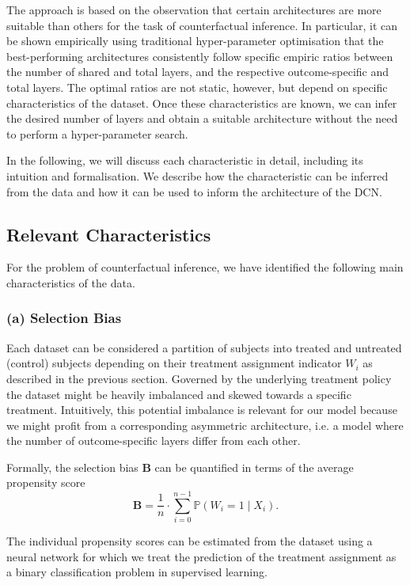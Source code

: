 The approach is based on the observation that certain architectures are more suitable than others for the task of counterfactual inference. In particular, it can be shown empirically using traditional hyper-parameter optimisation that the best-performing architectures consistently follow specific empiric ratios between the number of shared and total layers, and the respective outcome-specific and total layers. The optimal ratios are not static, however, but depend on specific characteristics of the dataset. Once these characteristics are known, we can infer the desired number of layers and obtain a suitable architecture without the need to perform a hyper-parameter search.

In the following, we will discuss each characteristic in detail, including its intuition and formalisation. We describe how the characteristic can be inferred from the data and how it can be used to inform the architecture of the DCN.


\subsection{Relevant Characteristics}
For the problem of counterfactual inference, we have identified the following main characteristics of the data. 

\subsubsection{(a) Selection Bias}
Each dataset can be considered a partition  of subjects into treated and untreated (control) subjects depending on their treatment assignment indicator $W_i$ as described in the previous section. Governed by the underlying treatment policy the dataset might be heavily imbalanced and skewed towards a specific treatment. 
Intuitively, this potential imbalance is relevant for our model because we might profit from a corresponding asymmetric architecture, i.e. a model where the number of outcome-specific layers differ from each other. 

Formally, the selection bias $\mathbf{B}$ can be quantified in terms of the average propensity score 
$$
\mathbf{B} = \frac{1}{n} \cdot \sum \limits_{{i=0}}^{n-1}  \mathbb{P}(W_i = 1 \mid X_i).
$$

The individual propensity scores can be estimated from the dataset using a neural network for which we treat the prediction of the treatment assignment as a binary classification problem in supervised learning. 



